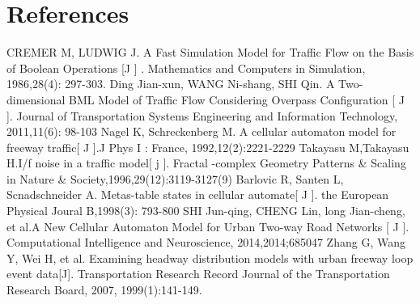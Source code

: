 \documentclass{mcmthesis}
\begin{document}
\section{References}
\begin{thebibliography}{99}
CREMER M, LUDWIG J. A Fast Simulation Model for Traffic Flow on the Basis of Boolean Operations [J ] . Mathematics and Computers in Simulation, 1986,28(4): 297-303.
Ding Jian-xun, WANG Ni-shang, SHI Qin. A Two-dimensional BML Model of Traffic Flow Considering Overpass Configuration [ J ]. Journal of Transportation Systems Engineering and Information Technology, 2011,11(6): 98-103
Nagel K, Schreckenberg M. A cellular automaton model for freeway traffic[ J ].J Phys I : France, 1992,12(2):2221-2229
Takayasu M,Takayasu H.I/f  noise in a traffic model[ j ]. Fractal -complex Geometry Patterns \& Scaling in Nature \& Society,1996,29(12):3119-3127(9)
Barlovic R, Santen L, Scnadschneider A. Metas-table states in cellular automate[ J ]. the European Physical Joural B,1998(3): 793-800
SHI Jun-qing, CHENG Lin, long Jian-cheng, et al.A New Cellular Automaton Model for Urban Two-way Road Networks [ J ]. Computational Intelligence and Neuroscience, 2014,2014;685047
Zhang G, Wang Y, Wei H, et al. Examining headway distribution models with urban freeway loop event data[J]. Transportation Research Record Journal of the Transportation Research Board, 2007, 1999(1):141-149.
\end{thebibliography}
\end{document}

